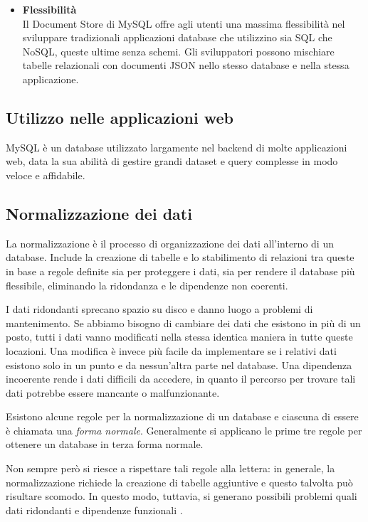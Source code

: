 \begin{itemize}
    \item \textbf{Flessibilità}\\
    Il Document Store di MySQL offre agli utenti una massima flessibilità nel sviluppare tradizionali applicazioni database che utilizzino sia SQL che NoSQL, queste ultime senza schemi. Gli sviluppatori possono mischiare tabelle relazionali con documenti JSON nello stesso database e nella stessa applicazione.
\end{itemize}

\subsection{Utilizzo nelle applicazioni web}
MySQL è un database utilizzato largamente nel backend di molte applicazioni web, data la sua abilità di gestire grandi dataset e query complesse in modo veloce e affidabile.

\subsection{Normalizzazione dei dati}
La normalizzazione è il processo di organizzazione dei dati all'interno di un database. Include la creazione di tabelle e lo stabilimento di relazioni tra queste in base a regole definite sia per proteggere i dati, sia per rendere il database più flessibile, eliminando la ridondanza e le dipendenze non coerenti.

I dati ridondanti sprecano spazio su disco e danno luogo a problemi di mantenimento. Se abbiamo bisogno di cambiare dei dati che esistono in più di un posto, tutti i dati vanno modificati nella stessa identica maniera in tutte queste locazioni. Una modifica è invece più facile da implementare se i relativi dati esistono solo in un punto e da nessun'altra parte nel database. Una dipendenza incoerente rende i dati difficili da accedere, in quanto il percorso per trovare tali dati potrebbe essere mancante o malfunzionante.

Esistono alcune regole per la normalizzazione di un database e ciascuna di essere è chiamata una \textit{forma normale}. Generalmente si applicano le prime tre regole per ottenere un database in terza forma normale.

Non sempre però si riesce a rispettare tali regole alla lettera: in generale, la normalizzazione richiede la creazione di tabelle aggiuntive e questo talvolta può risultare scomodo. In questo modo, tuttavia, si generano possibili problemi quali dati ridondanti e dipendenze funzionali \cite{Database_Normalization}.

